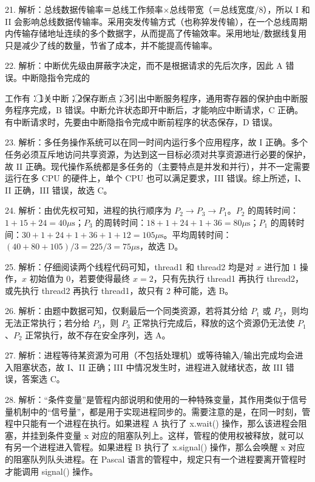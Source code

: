 \documentclass[UTF8,11pt]{ctexart}
\begin{document}
21. 解析：总线数据传输率＝总线工作频率×总线带宽（＝总线宽度/8），所以 I 和 II 会影响总线数据传输率。采用突发传输方式（也称猝发传输），在一个总线周期内传输存储地址连续的多个数据字，从而提高了传输效率。采用地址/数据线复用只是减少了线的数量，节省了成本，并不能提高传输率。


22. 解析：中断优先级由屏蔽字决定，而不是根据请求的先后次序，因此 A 错误。中断隐指令完成的


工作有：\textcircled{1}关中断；\textcircled{2}保存断点；\textcircled{3}引出中断服务程序，通用寄存器的保护由中断服务程序完成，B 错误。中断允许状态即开中断后，才能响应中断请求，C 正确。有中断请求时，先要由中断隐指令完成中断前程序的状态保存，D 错误。


23. 解析：多任务操作系统可以在同一时间内运行多个应用程序，故 I 正确。多个任务必须互斥地访问共享资源，为达到这一目标必须对共享资源进行必要的保护，故 II 正确。现代操作系统都是多任务的（主要特点是并发和并行），并不一定需要运行在多 CPU 的硬件上，单个 CPU 也可以满足要求，III 错误。综上所述，I、II 正确，III 错误，故选 C。


24. 解析：由优先权可知，进程的执行顺序为 \(\displaystyle P_2\to P_3\to P_1\)。\(\displaystyle P_2\) 的周转时间：\(\displaystyle 1+15+24=40\mu\mathrm{s}\)；\(\displaystyle P_3\) 的周转时间：\(\displaystyle 18+1+24+1+36=80\mu\mathrm{s}\)；\(\displaystyle P_1\) 的周转时间：\(\displaystyle 30+1+24+1+36+1+12=105\mu\mathrm{s}\)。平均周转时间：\(\displaystyle (40+80+105)/3=225/3=75\mu\mathrm{s}\)，故选 D。


25. 解析：仔细阅读两个线程代码可知，thread1 和 thread2 均是对 \(\displaystyle x\) 进行加 1 操作，\(\displaystyle x\) 初始值为 0，若要使得最终 \(\displaystyle x=2\)，只有先执行 thread1 再执行 thread2，或先执行 thread2 再执行 thread1，故只有 2 种可能，选 B。


26. 解析：由题中数据可知，仅剩最后一个同类资源，若将其分给 \(\displaystyle P_1\) 或 \(\displaystyle P_2\)，则均无法正常执行；若分给 \(\displaystyle P_3\)，则 \(\displaystyle P_3\) 正常执行完成后，释放的这个资源仍无法使 \(\displaystyle P_1\)、\(\displaystyle P_2\) 正常执行，故不存在安全序列，选 A。


27. 解析：进程等待某资源为可用（不包括处理机）或等待输入/输出完成均会进入阻塞状态，故 I、II 正确；III 中情况发生时，进程进入就绪状态，故 III 错误，答案选 C。


28. 解析：“条件变量”是管程内部说明和使用的一种特殊变量，其作用类似于信号量机制中的“信号量”，都是用于实现进程同步的。需要注意的是，在同一时刻，管程中只能有一个进程在执行。如果进程 A 执行了 x.wait() 操作，那么该进程会阻塞，并挂到条件变量 x 对应的阻塞队列上。这样，管程的使用权被释放，就可以有另一个进程进入管程。如果进程 B 执行了 x.signal() 操作，那么会唤醒 x 对应的阻塞队列队头进程。在 Pascal 语言的管程中，规定只有一个进程要离开管程时才能调用 signal() 操作。
\end{document}
